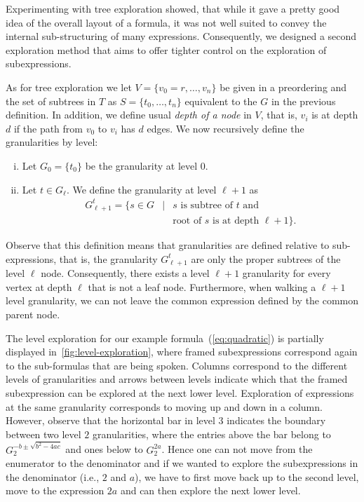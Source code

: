 \documentclass{acm_proc_article-sp}
\begin{document}
Experimenting with tree exploration showed, that while it gave a pretty good
idea of the overall layout of a formula, it was not well suited to convey the
internal sub-structuring of many expressions. Consequently, we designed a second
exploration method that aims to offer tighter control on the exploration of
subexpressions.

As for tree exploration we let $V=\{v_0=r,\ldots,v_n\}$ be given in a
preordering and the set of subtrees in $T$ as $S=\{t_0,\ldots, t_n\}$ equivalent
to the $G$ in the previous definition. In addition, we define usual \emph{depth
  of a node} in $V$, that is, $v_i$ is at depth $d$ if the path from $v_0$ to
$v_i$ has $d$ edges. We now recursively define the granularities by level:
\begin{enumerate}[(i)]
\item Let $G_0=\{t_0\}$ be the granularity at level $0$.
\item Let $t\in G_\ell$. We define the granularity at level $\ell + 1$ as
  \begin{eqnarray*}
    G^t_{\ell+1} = \{s\in G & | & s \mbox{ is subtree of } t\mbox{ and }\\ 
    & & \mbox{root of } s \mbox{ is at depth } \ell+1\}.
  \end{eqnarray*}
\end{enumerate}
Observe that this definition means that granularities are defined relative to
sub-expressions, that is, the granularity $G^t_{\ell+1}$ are only the proper
subtrees of the level $\ell$ node. Consequently, there exists a level $\ell+1$
granularity for every vertex at depth $\ell$ that is not a leaf
node. Furthermore, when walking a $\ell+1$ level granularity, we can not leave
the common expression defined by the common parent node.

The level exploration for our example formula~(\ref{eq:quadratic}) is partially
displayed in~\ref{fig:level-exploration}, where framed subexpressions correspond
again to the sub-formulas that are being spoken. Columns correspond to the
different levels of granularities and arrows between levels indicate which that
the framed subexpression can be explored at the next lower level. Exploration of
expressions at the same granularity corresponds to moving up and down in a
column. However, observe that the horizontal bar in level $3$ indicates the
boundary between two level $2$ granularities, where the entries above the bar
belong to $G^{-b\pm\sqrt{b^2-4ac}}_2$ and ones below to $G^{2a}_2$. Hence one
can not move from the enumerator to the denominator and if we wanted to explore
the subexpressions in the denominator (i.e., $2$ and $a$), we have to first move
back up to the second level, move to the expression $2a$ and can then explore
the next lower level.
\end{document}
